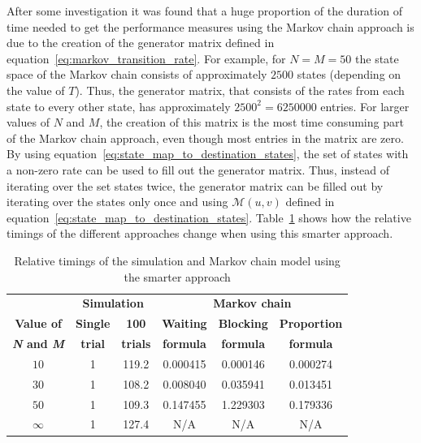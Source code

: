 After some investigation it was found that a huge proportion of the duration of
time needed to get the performance measures using the Markov chain approach is
due to the creation of the generator matrix defined in
equation~\eqref{eq:markov_transition_rate}.
For example, for \(N = M = 50\) the state space of the Markov chain consists
of approximately \(2500\) states (depending on the value of \(T\)).
Thus, the generator matrix, that consists of the rates from each state to every
other state, has approximately \(2500^2 = 6250000\) entries.
For larger values of \(N\) and \(M\), the creation of this matrix is the most
time consuming part of the Markov chain approach, even though most entries in
the matrix are zero.
By using equation~\eqref{eq:state_map_to_destination_states}, the set of states
with a non-zero rate can be used to fill out the generator matrix.
Thus, instead of iterating over the set states twice, the generator matrix can
be filled out by iterating over the states only once and using
\(\mathcal{M}(u,v)\) defined in
equation~\eqref{eq:state_map_to_destination_states}.
Table~\ref{tab:truncation_effect_timings_new} shows how the relative timings
of the different approaches change when using this smarter approach.


\tiny
\begin{table}[H]
    \centering
    \caption{Relative timings of the simulation and Markov chain model using
    the smarter approach}
    \begin{tabular}{c|cc|ccc}
        & \multicolumn{2}{c}{\textbf{Simulation}} &
        \multicolumn{3}{c}{\textbf{Markov chain}} \\
        \textbf{Value of} & \textbf{Single} & \textbf{100} &
        \textbf{Waiting} & \textbf{Blocking} &
        \textbf{Proportion} \\
        \textbf{\textit{N} and \textit{M}} & \textbf{trial} & \textbf{trials} &
        \textbf{formula} & \textbf{formula} & \textbf{formula} \\
        \hline
        \(10\) & 1 & 119.2 & 0.000415 & 0.000146 & 0.000274 \\
        \hline
        \(30\) & 1 & 108.2 & 0.008040 & 0.035941 & 0.013451 \\
        \hline
        \(50\) & 1 & 109.3 & 0.147455 & 1.229303 & 0.179336 \\
        \hline
        \(\infty\) & 1 & 127.4 & N/A & N/A & N/A \\
    \end{tabular}
    \label{tab:truncation_effect_timings_new}
\end{table}
\normalsize

